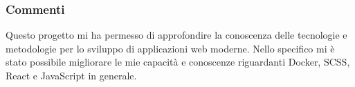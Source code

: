 \documentclass{report}
\begin{document}
\subsubsection{Commenti}
Questo progetto mi ha permesso di approfondire la conoscenza delle tecnologie e metodologie per lo sviluppo di applicazioni web moderne. Nello specifico mi è stato possibile migliorare le mie capacità e conoscenze riguardanti Docker, SCSS, React e JavaScript in generale.



\end{document}
